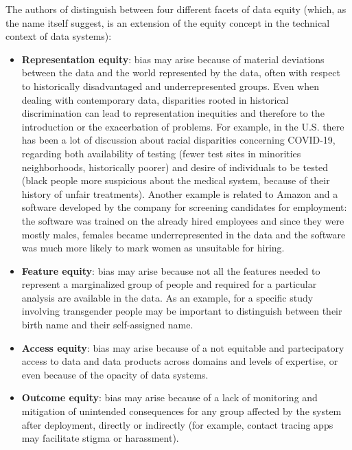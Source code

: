 The authors of \cite{jagadish2021facets} distinguish between four different facets of data equity (which, as the name itself suggest, is an extension of the equity concept in the technical context of data systems):
\begin{itemize}
\item \textbf{Representation equity}: bias may arise because of material deviations between the data and the world represented by the data, often with respect to historically disadvantaged and underrepresented groups. Even when dealing with contemporary data, disparities rooted in historical discrimination can lead to representation inequities and therefore to the introduction or the exacerbation of problems. For example, in the U.S. there has been a lot of discussion about racial disparities concerning COVID-19, regarding both availability of testing (fewer test sites in minorities neighborhoods, historically poorer) and desire of individuals to be tested (black people more suspicious about the medical system, because of their history of unfair treatments). Another example is related to Amazon and a software developed by the company for screening candidates for employment: the software was trained on the already hired employees and since they were mostly males, females became underrepresented in the data and the software was much more likely to mark women as unsuitable for hiring.
\item \textbf{Feature equity}: bias may arise because not all the features needed to represent a marginalized group of people and required for a particular analysis are available in the data. As an example, for a specific study involving transgender people may be important to distinguish between their birth name and their self-assigned name.
\item \textbf{Access equity}: bias may arise because of a not equitable and partecipatory access to data and data products across domains and levels of expertise, or even because of the opacity of data systems.
\item \textbf{Outcome equity}: bias may arise because of a lack of monitoring and mitigation of unintended consequences for any group affected by the system after deployment, directly or indirectly (for example, contact tracing apps may facilitate stigma or harassment).
\end{itemize}


